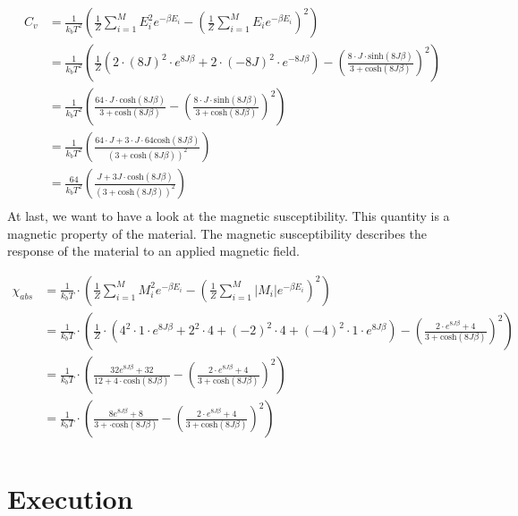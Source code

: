 \documentclass[10pt,a4paper]{article}
\begin{document}
\begin{align}
C_v &= \frac{1}{k_b T^2} \left( \frac{1}{Z} \sum_{i=1}^{M} E_i^2 e^{- \beta E_i } - \left( \frac{1}{Z} \sum_{i=1}^{M} E_i e^{- \beta E_i }  \right)^2 \right)\\
&=\frac{1}{k_b T^2} \left( \frac{1}{Z} \left( 2 \cdot (8J)^2 \cdot e^{8J \beta}+2 \cdot (-8J)^2 \cdot e^{-8J \beta} \right) - \left( \frac{8 \cdot J \cdot  \mathrm{sinh}(8J \beta ) }{3+\mathrm{cosh}(8J\beta)} \right)^2 \right)\\
&=\frac{1}{k_b T^2} \left( \frac{64\cdot J\cdot \mathrm{cosh}(8 J \beta )}{3+\mathrm{cosh}(8J\beta)}  - \left( \frac{8 \cdot J \cdot \mathrm{sinh}(8J \beta ) }{3+\mathrm{cosh}(8J\beta)} \right)^2 \right)\\
&= \frac{1}{k_b T^2} \left( \frac{64 \cdot J +3\cdot J \cdot 64 \mathrm{cosh}(8J \beta)}{\left(3+\mathrm{cosh}(8J\beta)\right)^2} \right)\\
&= \frac{64}{k_b T^2} \left( \frac{ J +3 J \cdot \mathrm{cosh}(8J \beta)}{\left(3+\mathrm{cosh}(8J\beta)\right)^2} \right)\\
\end{align}
At last, we want to have a look at the magnetic susceptibility. This quantity is a magnetic property of the material. The magnetic susceptibility describes the response of the material to an applied magnetic field. 


\begin{align}
\chi_{abs} &= \frac{1}{k_b T} \cdot \left( \frac{1}{Z} \sum_{i=1}^{M} M_i^2 e^{- \beta E_i } - \left( \frac{1}{Z} \sum_{i=1}^{M} |M_i| e^{- \beta E_i }  \right)^2 \right)\\
&= \frac{1}{k_b T} \cdot \left( \frac{1}{Z} \cdot \left( 4^2 \cdot 1 \cdot e^{8J\beta}+ 2^2 \cdot 4+(-2)^2 \cdot 4 + (-4)^2 \cdot 1 \cdot e^{8J \beta } \right) - \left( \frac{2 \cdot e^{8J\beta}+4}{3+ \mathrm{cosh}(8J\beta)} \right)^2 \right)\\
&= \frac{1}{k_b T} \cdot \left( \frac{32 e^{8J\beta}+32}{ 12+ 4 \cdot \mathrm{cosh} \left( 8J \beta \right)}- \left( \frac{2 \cdot e^{8J\beta}+4}{3+ \mathrm{cosh}(8J\beta)} \right)^2 \right)\\
&= \frac{1}{k_b T} \cdot \left(\frac{8 e^{8J\beta}+8}{ 3+ \cdot \mathrm{cosh} \left( 8J \beta \right)}- \left( \frac{2 \cdot e^{8J\beta}+4}{3+ \mathrm{cosh}(8J\beta)} \right)^2 \right)\\
\end{align}

\section{Execution}
\end{document}
